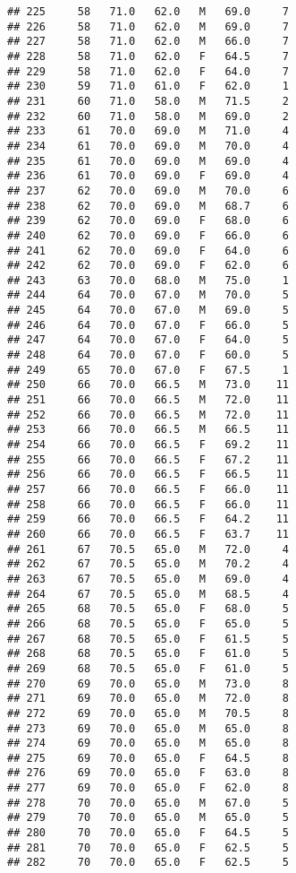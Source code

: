 \documentclass[
]{article}
\begin{document}
\begin{verbatim}
## 225     58   71.0   62.0   M   69.0     7
## 226     58   71.0   62.0   M   69.0     7
## 227     58   71.0   62.0   M   66.0     7
## 228     58   71.0   62.0   F   64.5     7
## 229     58   71.0   62.0   F   64.0     7
## 230     59   71.0   61.0   F   62.0     1
## 231     60   71.0   58.0   M   71.5     2
## 232     60   71.0   58.0   M   69.0     2
## 233     61   70.0   69.0   M   71.0     4
## 234     61   70.0   69.0   M   70.0     4
## 235     61   70.0   69.0   M   69.0     4
## 236     61   70.0   69.0   F   69.0     4
## 237     62   70.0   69.0   M   70.0     6
## 238     62   70.0   69.0   M   68.7     6
## 239     62   70.0   69.0   F   68.0     6
## 240     62   70.0   69.0   F   66.0     6
## 241     62   70.0   69.0   F   64.0     6
## 242     62   70.0   69.0   F   62.0     6
## 243     63   70.0   68.0   M   75.0     1
## 244     64   70.0   67.0   M   70.0     5
## 245     64   70.0   67.0   M   69.0     5
## 246     64   70.0   67.0   F   66.0     5
## 247     64   70.0   67.0   F   64.0     5
## 248     64   70.0   67.0   F   60.0     5
## 249     65   70.0   67.0   F   67.5     1
## 250     66   70.0   66.5   M   73.0    11
## 251     66   70.0   66.5   M   72.0    11
## 252     66   70.0   66.5   M   72.0    11
## 253     66   70.0   66.5   M   66.5    11
## 254     66   70.0   66.5   F   69.2    11
## 255     66   70.0   66.5   F   67.2    11
## 256     66   70.0   66.5   F   66.5    11
## 257     66   70.0   66.5   F   66.0    11
## 258     66   70.0   66.5   F   66.0    11
## 259     66   70.0   66.5   F   64.2    11
## 260     66   70.0   66.5   F   63.7    11
## 261     67   70.5   65.0   M   72.0     4
## 262     67   70.5   65.0   M   70.2     4
## 263     67   70.5   65.0   M   69.0     4
## 264     67   70.5   65.0   M   68.5     4
## 265     68   70.5   65.0   F   68.0     5
## 266     68   70.5   65.0   F   65.0     5
## 267     68   70.5   65.0   F   61.5     5
## 268     68   70.5   65.0   F   61.0     5
## 269     68   70.5   65.0   F   61.0     5
## 270     69   70.0   65.0   M   73.0     8
## 271     69   70.0   65.0   M   72.0     8
## 272     69   70.0   65.0   M   70.5     8
## 273     69   70.0   65.0   M   65.0     8
## 274     69   70.0   65.0   M   65.0     8
## 275     69   70.0   65.0   F   64.5     8
## 276     69   70.0   65.0   F   63.0     8
## 277     69   70.0   65.0   F   62.0     8
## 278     70   70.0   65.0   M   67.0     5
## 279     70   70.0   65.0   M   65.0     5
## 280     70   70.0   65.0   F   64.5     5
## 281     70   70.0   65.0   F   62.5     5
## 282     70   70.0   65.0   F   62.5     5

\end{verbatim}
\end{document}
